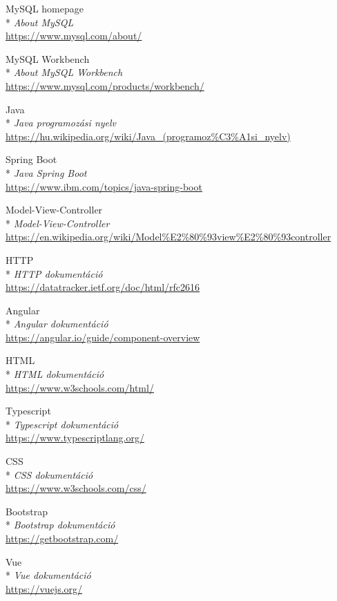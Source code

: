 \begin{thebibliography}{x}
 MySQL homepage\\*
\textit{About MySQL}
\\ \url{https://www.mysql.com/about/}

 MySQL Workbench\\*
\textit{About MySQL Workbench}
\\ \url{https://www.mysql.com/products/workbench/}

 Java\\*
\textit{Java programozási nyelv}
\\ \url{https://hu.wikipedia.org/wiki/Java_(programoz%C3%A1si_nyelv)}

 Spring Boot\\*
\textit{Java Spring Boot}
\\ \url{https://www.ibm.com/topics/java-spring-boot}

 Model-View-Controller\\*
\textit{Model-View-Controller}
\\ \url{https://en.wikipedia.org/wiki/Model%E2%80%93view%E2%80%93controller}

 HTTP\\*
\textit{HTTP dokumentáció}
\\ \url{https://datatracker.ietf.org/doc/html/rfc2616}

 Angular\\*
\textit{Angular dokumentáció}
\\ \url{https://angular.io/guide/component-overview}

 HTML\\*
\textit{HTML dokumentáció}
\\ \url{https://www.w3schools.com/html/}

 Typescript\\*
\textit{Typescript dokumentáció}
\\ \url{https://www.typescriptlang.org/}

 CSS\\*
\textit{CSS dokumentáció}
\\ \url{https://www.w3schools.com/css/}

 Bootstrap\\*
\textit{Bootstrap dokumentáció}
\\ \url{https://getbootstrap.com/}

 Vue\\*
\textit{Vue dokumentáció}
\\ \url{https://vuejs.org/}


\end{thebibliography}
